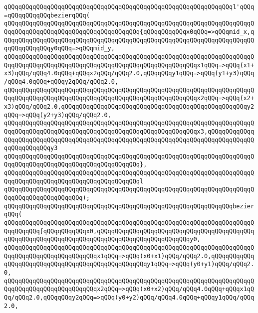 \verb|qQQqqQQqqQQqqQQqqQQqqQQqqQQqqQQqqQQqqQQqqQQqqQQqqQQqqQQqqQQqqQQql'qQQq=qQQqqQQqqQQqbezierqQQq(|\newline
\verb|qQQqqQQqqQQqqQQqqQQqqQQqqQQqqQQqqQQqqQQqqQQqqQQqqQQqqQQqqQQqqQQqqQQqqQQqqQQqqQQqqQQqqQQqqQQqqQQqqQQqqQQqqQQq{qQQqqQQqqQQqx0qQQq=>qQQqmid_x,qQQqqQQqqQQqqQQqqQQqqQQqqQQqqQQqqQQqqQQqqQQqqQQqqQQqqQQqqQQqqQQqqQQqqQQqqQQqqQQqqQQqy0qQQq=>qQQqmid_y,|\newline
\verb|qQQqqQQqqQQqqQQqqQQqqQQqqQQqqQQqqQQqqQQqqQQqqQQqqQQqqQQqqQQqqQQqqQQqqQQqqQQqqQQqqQQqqQQqqQQqqQQqqQQqqQQqqQQqqQQqqQQqqQQqqQQqx1qQQq=>qQQq(x1+x3)qQQq/qQQq4.0qQQq+qQQqx2qQQq/qQQq2.0,qQQqqQQqy1qQQq=>qQQq(y1+y3)qQQq/qQQq4.0qQQq+qQQqy2qQQq/qQQq2.0,|\newline
\verb|qQQqqQQqqQQqqQQqqQQqqQQqqQQqqQQqqQQqqQQqqQQqqQQqqQQqqQQqqQQqqQQqqQQqqQQqqQQqqQQqqQQqqQQqqQQqqQQqqQQqqQQqqQQqqQQqqQQqqQQqqQQqx2qQQq=>qQQq(x2+x3)qQQq/qQQq2.0,qQQqqQQqqQQqqQQqqQQqqQQqqQQqqQQqqQQqqQQqqQQqqQQqqQQqy2qQQq=>qQQq(y2+y3)qQQq/qQQq2.0,|\newline
\verb|qQQqqQQqqQQqqQQqqQQqqQQqqQQqqQQqqQQqqQQqqQQqqQQqqQQqqQQqqQQqqQQqqQQqqQQqqQQqqQQqqQQqqQQqqQQqqQQqqQQqqQQqqQQqqQQqqQQqqQQqqQQqx3,qQQqqQQqqQQqqQQqqQQqqQQqqQQqqQQqqQQqqQQqqQQqqQQqqQQqqQQqqQQqqQQqqQQqqQQqqQQqqQQqqQQqqQQqqQQqqQQqy3|\newline
\verb|qQQqqQQqqQQqqQQqqQQqqQQqqQQqqQQqqQQqqQQqqQQqqQQqqQQqqQQqqQQqqQQqqQQqqQQqqQQqqQQqqQQqqQQqqQQqqQQqqQQqqQQqqQQq},|\newline
\verb|qQQqqQQqqQQqqQQqqQQqqQQqqQQqqQQqqQQqqQQqqQQqqQQqqQQqqQQqqQQqqQQqqQQqqQQqqQQqqQQqqQQqqQQqqQQqqQQqqQQqqQQqqQQql|\newline
\verb|qQQqqQQqqQQqqQQqqQQqqQQqqQQqqQQqqQQqqQQqqQQqqQQqqQQqqQQqqQQqqQQqqQQqqQQqqQQqqQQqqQQqqQQqqQQq);|\newline
\newline
\verb|qQQqqQQqqQQqqQQqqQQqqQQqqQQqqQQqqQQqqQQqqQQqqQQqqQQqqQQqqQQqqQQqbezierqQQq(|\newline
\verb|qQQqqQQqqQQqqQQqqQQqqQQqqQQqqQQqqQQqqQQqqQQqqQQqqQQqqQQqqQQqqQQqqQQqqQQqqQQqqQQq{qQQqqQQqqQQqx0,qQQqqQQqqQQqqQQqqQQqqQQqqQQqqQQqqQQqqQQqqQQqqQQqqQQqqQQqqQQqqQQqqQQqqQQqqQQqqQQqqQQqqQQqqQQqqQQqy0,|\newline
\verb|qQQqqQQqqQQqqQQqqQQqqQQqqQQqqQQqqQQqqQQqqQQqqQQqqQQqqQQqqQQqqQQqqQQqqQQqqQQqqQQqqQQqqQQqqQQqqQQqx1qQQq=>qQQq(x0+x1)qQQq/qQQq2.0,qQQqqQQqqQQqqQQqqQQqqQQqqQQqqQQqqQQqqQQqqQQqqQQqqQQqy1qQQq=>qQQq(y0+y1)qQQq/qQQq2.0,|\newline
\verb|qQQqqQQqqQQqqQQqqQQqqQQqqQQqqQQqqQQqqQQqqQQqqQQqqQQqqQQqqQQqqQQqqQQqqQQqqQQqqQQqqQQqqQQqqQQqqQQqx2qQQq=>qQQq(x0+x2)qQQq/qQQq4.0qQQq+qQQqx1qQQq/qQQq2.0,qQQqqQQqy2qQQq=>qQQq(y0+y2)qQQq/qQQq4.0qQQq+qQQqy1qQQq/qQQq2.0,|\newline
